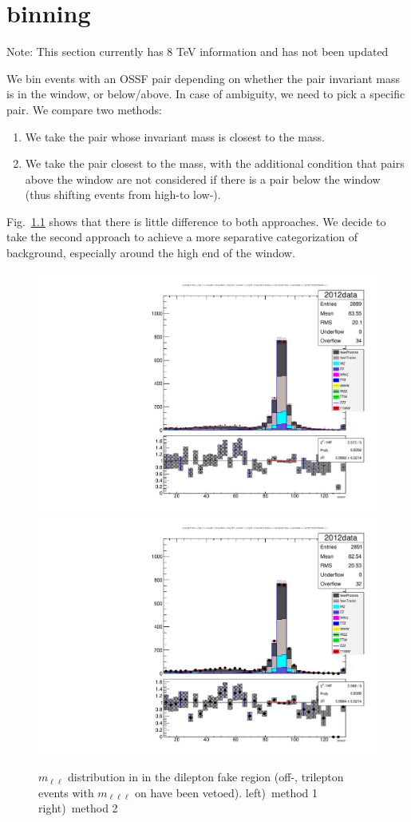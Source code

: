 \chapter{\texorpdfstring{\Z}{Z} binning}
\label{app:Zbinning}
Note: This section currently has 8 TeV information and has not been updated


We bin events with an OSSF pair depending on whether the pair invariant mass is in the \Z window, or below/above. In case of ambiguity, we need to pick a specific pair. We compare two methods:
\begin{enumerate}
	\item We take the pair whose invariant mass is closest to the \Z mass.
	\item We take the pair closest to the \Z mass, with the additional condition that pairs above the \Z window are not considered if there is a pair below the \Z window (thus shifting events from high-\Z to low-\Z).
\end{enumerate}
Fig.~\ref{fig:app:Zbinning} shows that there is little difference to both approaches. We decide to take the second approach to achieve a more separative categorization of background, especially around the high end of the \Z window.

\begin{figure}
\begin{center}
	\includegraphics[width=.5\textwidth]{Appendix/Z_NOTTRILEPTONONZ_oldMOSSF}%
	\includegraphics[width=.5\textwidth]{Appendix/Z_NOTTRILEPTONONZ_MOSSF}
	\caption{$m_{\ell\ell}$ distribution in in the dilepton fake region (off-\Z, trilepton events with $m_{\ell\ell\ell}$ on \Z have been vetoed). \enskip left)~method 1 \enskip right)~method 2
	\label{fig:app:Zbinning}}
\end{center}
\end{figure}
